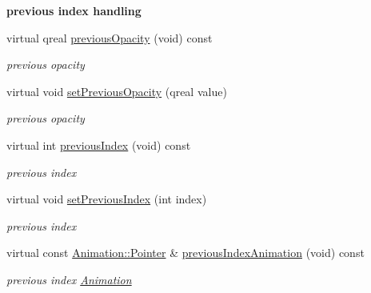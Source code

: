 \begin{Indent}\textbf{ previous index handling}\par
\begin{DoxyCompactItemize}
\item 
\mbox{\label{class_header_view_data_a2aeacd47466c48e9407d365df58582c5}} 
virtual qreal \hyperlink{class_header_view_data_a2aeacd47466c48e9407d365df58582c5}{previous\+Opacity} (void) const
\begin{DoxyCompactList}\small\item\em previous opacity \end{DoxyCompactList}\item 
\mbox{\label{class_header_view_data_a001413c07930ea4b2a5417eb48441475}} 
virtual void \hyperlink{class_header_view_data_a001413c07930ea4b2a5417eb48441475}{set\+Previous\+Opacity} (qreal value)
\begin{DoxyCompactList}\small\item\em previous opacity \end{DoxyCompactList}\item 
\mbox{\label{class_header_view_data_a430a0dbdce3e028eaa8fd0ba2699fb4f}} 
virtual int \hyperlink{class_header_view_data_a430a0dbdce3e028eaa8fd0ba2699fb4f}{previous\+Index} (void) const
\begin{DoxyCompactList}\small\item\em previous index \end{DoxyCompactList}\item 
\mbox{\label{class_header_view_data_aad2a3e567e74e8a6d6eaf976b7645212}} 
virtual void \hyperlink{class_header_view_data_aad2a3e567e74e8a6d6eaf976b7645212}{set\+Previous\+Index} (int index)
\begin{DoxyCompactList}\small\item\em previous index \end{DoxyCompactList}\item 
\mbox{\label{class_header_view_data_aef22e7a2e07acd0d8b1159a9fc083c1b}} 
virtual const \hyperlink{class_animation_ac48a8d074abd43dc3f6485353ba24e30}{Animation\+::\+Pointer} \& \hyperlink{class_header_view_data_aef22e7a2e07acd0d8b1159a9fc083c1b}{previous\+Index\+Animation} (void) const
\begin{DoxyCompactList}\small\item\em previous index \hyperlink{class_animation}{Animation} \end{DoxyCompactList}\end{DoxyCompactItemize}
\end{Indent}
